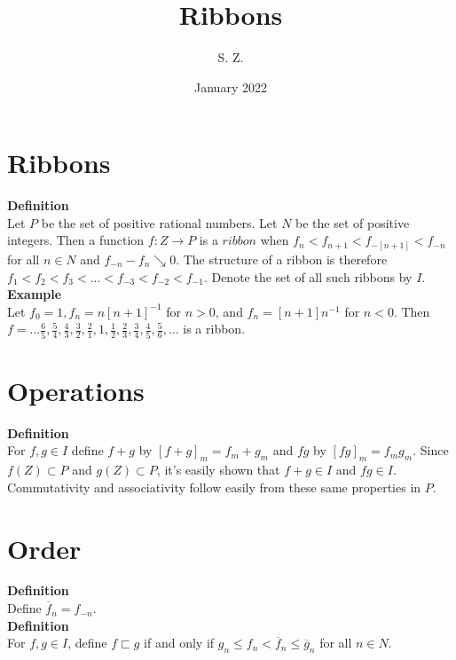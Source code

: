 \documentclass{article}
\title{Ribbons}
\author{S. Z. }
\date{January 2022}
\newcommand{\nat}{ N}
\newcommand{\rat}{ P }
\newcommand{\zee}{ Z }
\newcommand{\zeqs}{ I}
\newcommand{\sing}{ ribbon}
\newcommand{\of}{ \overline f}
\newcommand{\og}{ \overline g}
\newcommand{\forks}{ \sqsubset}
\begin{document}
\maketitle


\section{Ribbons}

\textbf{Definition}\\
Let $\rat$ be the set of positive rational numbers. Let $\nat$ be the set of positive integers. Then a function $f : \zee \to \rat$ is a \textbf{$\sing$} when $ f_n < f_{n+1} < f_{-[n+1]} < f_{-n}$ for all $n \in \nat $ and $f_{-n} - f_n \searrow 0$. The structure of a ribbon is therefore $f_1 < f_2 < f_3 < ... < f_{-3} < f_{-2} < f_{-1}$. Denote the set of all such ribbons by $\zeqs$.\\

\textbf{Example}\\
Let $f_0 = 1, f_n = n[n+1]^{-1}$ for $n > 0$, and $f_n = [n+1]n^{-1}$ for $n < 0$. Then  $f = ...\frac{6}{5},\frac{5}{4},\frac{4}{3},\frac{3}{2},\frac{2}{1},1,\frac{1}{2},\frac{2}{3},\frac{3}{4},\frac{4}{5},\frac{5}{6},... $ is a ribbon.\\

\section{Operations}

\textbf{Definition}\\
For $f,g \in \zeqs$ define $f + g$ by $[f + g]_m = f_m + g_m$ and $fg$ by $[fg]_m = f_m g_m$. Since $f(Z) \subset P$ and $g(Z) \subset P$, it's easily shown that $f + g \in \zeqs$ and $fg \in \zeqs$.  Commutativity and associativity follow easily from these same properties in $\rat$.\\

\section{Order}

\textbf{Definition}\\
Define $\of_n = f_{-n}$.\\

\textbf{Definition}\\
For $f,g \in \zeqs$, define $f \forks g$ if and only if $ g_n \le f_n< \of_n \le \og_n$ for all $n \in \nat$.\\
\end{document}
